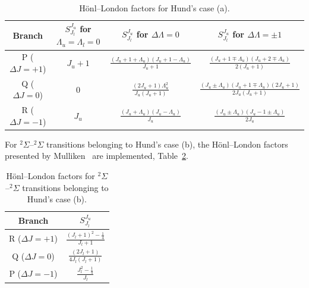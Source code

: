 \begin{table}[h]
 \center
 \caption{H\"{o}nl--London factors for Hund's case (a).}
 \label{tab:HundA_HLF}
 \begin{tabular*}{1.0\textwidth}{cccc}
  \hline Branch                           & $S^{J_u}_{J_l}$ for $\Lambda_u=\Lambda_l=0$ & $S^{J_u}_{J_l}$ for $\Delta \Lambda = 0$                                                                                  & $S^{J_u}_{J_l}$ for $\Delta \Lambda = \pm 1$ \\
  \hline  P ($\Delta J = +1$)     & $J_u + 1$                                                                      & $\frac{ \left ( J_u + 1 + \Lambda_u \right ) \left ( J_u + 1 - \Lambda_u \right ) }{ J_u + 1 }$  & $\frac{ \left ( J_u + 1 \mp \Lambda_u \right ) \left ( J_u + 2 \mp \Lambda_u \right ) }{ 2 \left ( J_u + 1 \right ) }$ \\
              Q ($\Delta J =  0$)      &0                                                                                       & $\frac{ \left ( 2 J_u + 1 \right ) \Lambda_u^2 }{ J_u \left ( J_u + 1 \right )  }$                           & $\frac{ \left ( J_u \pm \Lambda_u \right ) \left ( J_u + 1 \mp \Lambda_u \right ) \left ( 2 J_u + 1 \right ) }{ 2  J_u \left ( J_u + 1 \right ) }$ \\
              R  ($\Delta J = -1$)    & $J_u$                                                                             & $\frac{ \left ( J_u + \Lambda_u \right ) \left ( J_u - \Lambda_u \right ) }{ J_u }$                      & $\frac{ \left ( J_u \pm \Lambda_u \right ) \left ( J_u - 1 \pm \Lambda_u \right ) }{ 2 J_u }$ \\
  \hline
 \end{tabular*}
\end{table}

For $^2\Sigma$--$^2\Sigma$ transitions belonging to Hund's case (b), the H\"{o}nl--London factors presented by Mulliken~\cite{Mulliken31} are implemented, Table~\ref{tab:HundB_HLF}.

\begin{table}[h]
 \center
 \caption{H\"{o}nl--London factors for $^2\Sigma$--$^2\Sigma$ transitions belonging to Hund's case (b).}
 \label{tab:HundB_HLF}
 \begin{tabular*}{0.3\textwidth}{cc}
  \hline Branch                          & $S^{J_u}_{J_l}$ \\
  \hline  R ($\Delta J = +1$)    & $\frac{ \left ( J_l + 1 \right )^2 - \frac{1}{4} }{J_l + 1}$ \\
              Q ($\Delta J =   0$)    & $\frac{ \left ( 2 J_l + 1 \right )}{4 J_l \left ( J_l + 1 \right ) }$ \\
              P  ($\Delta J = -1$)    & $\frac{ J_l^2 - \frac{1}{4} }{J_l}$ \\
  \hline
 \end{tabular*}
\end{table}


